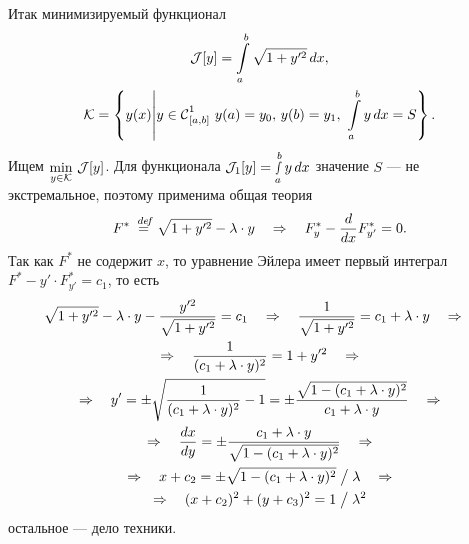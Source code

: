 Итак минимизируемый функционал
\begin{multline*}
	\J[y]=\int\limits_a^b\sqrt{1+y^{\prime2}}\,dx,\\
	\K=\left\{y(x)\middle|y\in\Cfn[{[a,b]}]{1}\ y(a)=y_0,\,y(b)=y_1,\ \int\limits_a^b y\,dx=S\right\}.
\end{multline*}
Ищем $\min\limits_{y\in\mathcal{K}}\,\mathcal{J}[y]$. Для функционала $\mathcal{J}_1[y]=\smallint\limits_a^b y\,dx$ значение $S$ --- не экстремальное, поэтому применима общая теория
\begin{equation*}
	 F^{\ast}\stackrel{\hspace{0.09 cm}de\!f}{=}\sqrt{1+y^{\prime2}}-\lambda\cdot y\quad\Rightarrow\quad F^{\ast}_{y}-\frac{d}{dx}F^{\ast}_{y'}=0.
\end{equation*}
Так как $F^{\ast}$ не содержит $x$, то уравнение Эйлера имеет первый интеграл $F^{\ast}-y'\cdot F^{\ast}_{y'}=c_1$, то есть
\begin{multline*}
	\sqrt{1+y^{\prime2}}-\lambda\cdot y-\frac{y^{\prime2}}{\sqrt{1+y^{\prime2}}}=c_1\quad\Rightarrow\quad
	\frac{1}{\sqrt{1+y^{\prime2}}}=c_1+\lambda\cdot y\quad\Rightarrow\quad\\\Rightarrow\quad\frac{1}{(c_1+\lambda\cdot y)^2}=1+y^{\prime2}\quad\Rightarrow\\\Rightarrow\quad y'=\pm\sqrt{\frac{1}{(c_1+\lambda\cdot y)^2}-1}=\pm\frac{\sqrt{1-(c_1+\lambda\cdot y)^2}}{c_1+\lambda\cdot y}\quad\Rightarrow\\\Rightarrow\quad\frac{dx}{dy}=\pm\frac{c_1+\lambda\cdot y}{\sqrt{1-(c_1+\lambda\cdot y)^2}}\quad\Rightarrow\\\Rightarrow\quad x+c_2=\pm\sqrt{1-(c_1+\lambda\cdot y)^2}\bigm/\lambda\quad\Rightarrow\\\Rightarrow\quad (x+c_2)^2+(y+c_3)^2=1\bigm/\lambda^2
\end{multline*}
остальное --- дело техники.
